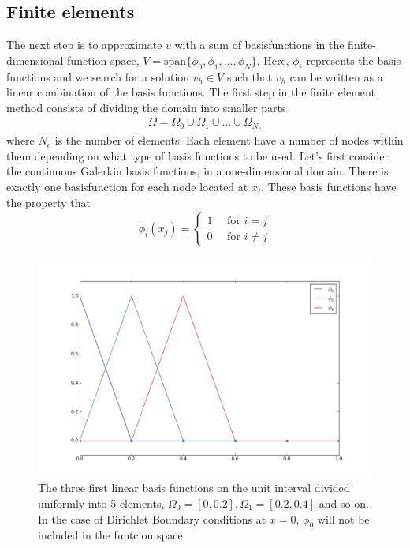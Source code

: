 \subsection{Finite elements} \label{FinEle}
The next step is to approximate $v$ with a sum of basisfunctions in the finite-dimensional function space, $V = \text{span}\{\phi_0, \phi_1, ..., \phi_N \}$. Here, $\phi_i$ represents the basis functions and we search for a solution $v_h \in V$ such that $v_h$ can be written as a linear combination of the basis functions. 
The first step in the finite element method consists of dividing the domain into smaller parts
\begin{align*}
\Omega = \Omega_0 \cup \Omega_1 \cup ... \cup \Omega_{N_e}
\end{align*}
where $N_e$ is the number of elements. Each element have a number of nodes within them depending on what type of basis functions to be used. Let's first consider the continuous Galerkin basis functions, in a one-dimensional domain. There is exactly one basisfunction for each node located at $x_i$. These basis functions have the property that
\begin{align*}
\phi_i(x_j) = \begin{cases}
				1 \quad \text{ for } i=j \\
				0 \quad \text{ for } i\neq j
		 		\end{cases}
\end{align*}
\begin{figure}[!ht]
  \begin{center}
    \includegraphics[scale=0.4]{figures/hats.png}
  \end{center}
	\caption{The three first linear basis functions on the unit interval divided uniformly into 5 elements, $\Omega_0 = [0,0.2], \Omega_1 = [0.2,0.4]$ and so on. In the case of Dirichlet Boundary conditions at $x=0$, $\phi_0$ will not be included in the funtcion space}
	\label{fig:Hats}
\end{figure}
